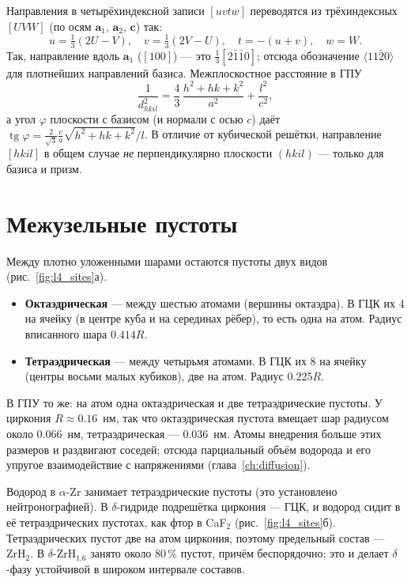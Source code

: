 Направления в четырёхиндексной записи $[uvtw]$ переводятся из трёхиндексных $[UVW]$ (по осям $\mathbf a_1$,
$\mathbf a_2$, $\mathbf c$) так:
\begin{equation}
u = \tfrac13(2U - V),\quad v = \tfrac13(2V - U),\quad t = -(u+v),\quad w = W .
\end{equation}
Так, направление вдоль $\mathbf a_1$ ($[100]$) --- это $\tfrac13[2\bar1\bar10]$; отсюда обозначение
$\langle11\bar20\rangle$ для плотнейших направлений базиса. Межплоскостное расстояние в ГПУ
\begin{equation}
\frac{1}{d^2_{hkil}} = \frac43\,\frac{h^2+hk+k^2}{a^2} + \frac{l^2}{c^2},
\end{equation}
а угол $\varphi$ плоскости с базисом (и нормали с осью $c$) даёт
$\operatorname{tg}\varphi = \frac{2}{\sqrt3}\frac{c}{a}\sqrt{h^2+hk+k^2}/l$. В отличие от кубической решётки,
направление $[hkil]$ в общем случае \emph{не} перпендикулярно плоскости $(hkil)$ --- только для базиса и призм.

\section{Межузельные пустоты}

Между плотно уложенными шарами остаются пустоты двух видов (рис.~\ref{fig:l4_sites}а).
\begin{itemize}
\item \textbf{Октаэдрическая} --- между шестью атомами (вершины октаэдра). В ГЦК их 4 на ячейку (в центре куба и
  на серединах рёбер), то есть одна на атом. Радиус вписанного шара $0.414R$.
\item \textbf{Тетраэдрическая} --- между четырьмя атомами. В ГЦК их 8 на ячейку (центры восьми малых кубиков),
  две на атом. Радиус $0.225R$.
\end{itemize}
В ГПУ то же: на атом одна октаэдрическая и две тетраэдрические пустоты. У циркония $R\approx0.16$~нм, так что
октаэдрическая пустота вмещает шар радиусом около 0.066~нм, тетраэдрическая --- 0.036~нм. Атомы внедрения больше
этих размеров и раздвигают соседей; отсюда парциальный объём водорода и его упругое взаимодействие с напряжениями
(глава~\ref{ch:diffusion}).


\begin{zrbox}
Водород в $\alpha$-Zr занимает тетраэдрические пустоты (это установлено нейтронографией). В $\delta$-гидриде
подрешётка циркония --- ГЦК, и водород сидит в её тетраэдрических пустотах, как фтор в CaF$_2$
(рис.~\ref{fig:l4_sites}б). Тетраэдрических пустот две на атом циркония, поэтому предельный состав --- ZrH$_2$. В
$\delta$-ZrH$_{1.6}$ занято около 80\,\% пустот, причём беспорядочно; это и делает $\delta$-фазу устойчивой в широком
интервале составов.
\end{zrbox}

